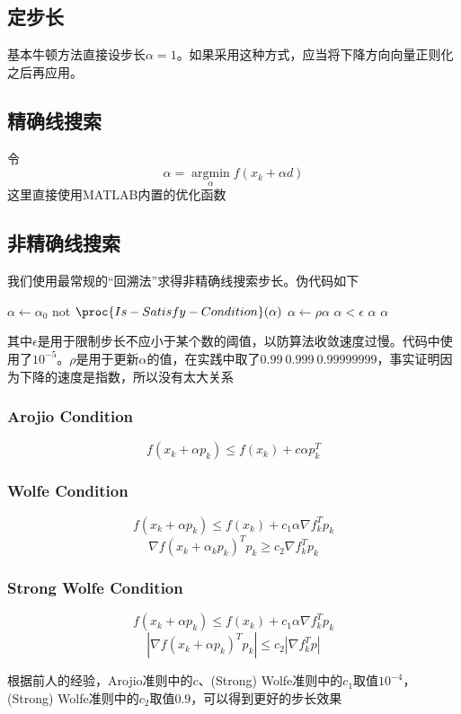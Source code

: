 \documentclass[11pt, a4paper]{article}
\begin{document}
\subsection{定步长}
基本牛顿方法直接设步长$\alpha=1$。如果采用这种方式，应当将下降方向向量正则化之后再应用。

\subsection{精确线搜索}
令\[\alpha=\mathop{\arg \min}\limits_\alpha f(x_k+\alpha d)\]
这里直接使用MATLAB内置的优化函数

\subsection{非精确线搜索}

我们使用最常规的“回溯法”求得非精确线搜索步长。伪代码如下
\begin{codebox}
\li $\alpha\gets\alpha_0$
\li \While not $\proc{Is-Satisfy-Condition}(\alpha)$
	\Do
\li		$\alpha\gets\rho\alpha$
\li		\If $\alpha<\epsilon$
\li			\Then  \Return $\alpha$		
		\End
	\End
\li \Return $\alpha$
\end{codebox}

其中$\epsilon$是用于限制步长不应小于某个数的阈值，以防算法收敛速度过慢。代码中使用了$10^{-5}$。$\rho$是用于更新$\alpha$的值，在实践中取了$0.99~0.999~0.99999999$，事实证明因为下降的速度是指数，所以没有太大关系


\subsubsection{Arojio Condition}
\[f(x_k+\alpha p_k)\le f(x_k)+c\alpha p_k^T\]

\subsubsection{Wolfe Condition}
\[f(x_k+\alpha p_k)\le f(x_k)+c_1\alpha\nabla f_k^Tp_k\]
\[\nabla f(x_k+\alpha_kp_k)^Tp_k \ge c_2\nabla f_k^Tp_k\]

\subsubsection{Strong Wolfe Condition}
\[f(x_k+\alpha p_k)\le f(x_k)+c_1\alpha\nabla f_k^Tp_k\]
\[|\nabla f(x_k+\alpha p_k)^Tp_k| \le c_2|\nabla f_k^Tp|\]

根据前人的经验\cite{gilbert1989some}，Arojio准则中的$c$、(Strong) Wolfe准则中的$c_1$取值$10^{-4}$，(Strong) Wolfe准则中的$c_2$取值$0.9$，可以得到更好的步长效果
\end{document}
